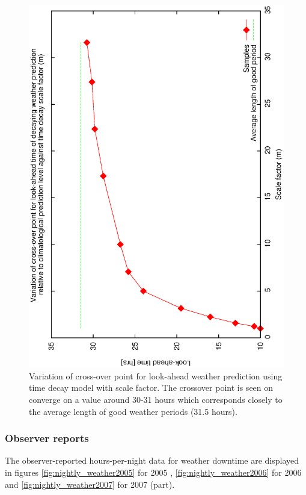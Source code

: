 {{\begin{figure}[htbp]
  \begin{center}
    \includegraphics[scale=0.4, angle=-90]{figures/ecs/m_crossover.eps}
  \end{center}   
  \caption[Variation of cross-over point for look-ahead weather prediction using time decay model with scale factor.]
  {Variation of cross-over point for look-ahead weather prediction using time decay model with scale factor. The crossover point is seen on converge on a value around 30-31 hours which corresponds closely to the average length of good weather periods (31.5 hours).}
  \label{fig:gbc_m_crossover}
\end{figure}




\subsubsection{Observer reports}
The observer-reported hours-per-night data for weather downtime are displayed in figures \ref{fig:nightly_weather2005} for 2005 , \ref{fig:nightly_weather2006} for 2006  and \ref{fig:nightly_weather2007} for 2007 (part).

}}
